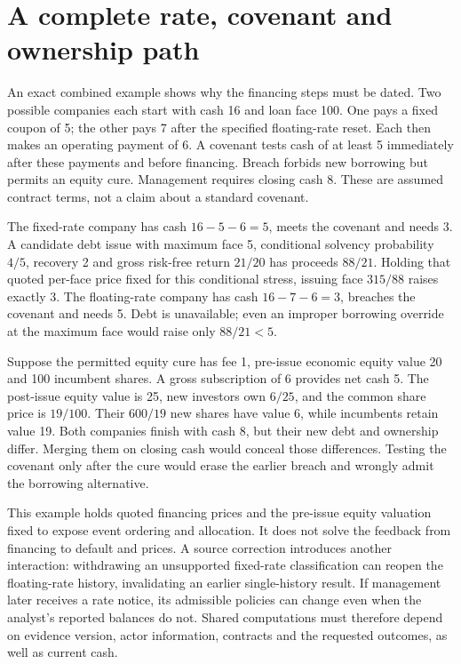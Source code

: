 


\section{A complete rate, covenant and ownership path}
An exact combined example shows why the financing steps must be dated. Two
possible companies each start with cash 16 and loan face 100. One pays a
fixed coupon of 5; the other pays 7 after the specified floating-rate reset.
Each then makes an operating payment of 6. A covenant tests cash of at least
5 immediately after these payments and before financing. Breach forbids new
borrowing but permits an equity cure. Management requires closing cash 8.
These are assumed contract terms, not a claim about a standard covenant.

The fixed-rate company has cash $16-5-6=5$, meets the covenant and needs 3.
A candidate debt issue with maximum face 5, conditional solvency probability
$4/5$, recovery 2 and gross risk-free return $21/20$ has proceeds $88/21$.
Holding that quoted per-face price fixed for this conditional stress, issuing
face $315/88$ raises exactly 3. The floating-rate company has cash
$16-7-6=3$, breaches the covenant and needs 5. Debt is unavailable; even an
improper borrowing override at the maximum face would raise only $88/21<5$.

Suppose the permitted equity cure has fee 1, pre-issue economic equity value
20 and 100 incumbent shares. A gross subscription of 6 provides net cash 5.
The post-issue equity value is 25, new investors own $6/25$, and the common
share price is $19/100$. Their $600/19$ new shares have value 6, while
incumbents retain value 19. Both companies finish with cash 8, but their new
debt and ownership differ. Merging them on closing cash would conceal those
differences. Testing the covenant only after the cure would erase the earlier
breach and wrongly admit the borrowing alternative.

This example holds quoted financing prices and the pre-issue equity valuation
fixed to expose event ordering and allocation. It does not solve the feedback
from financing to default and prices. A source correction introduces another
interaction: withdrawing an unsupported fixed-rate classification can reopen
the floating-rate history, invalidating an earlier single-history result.
If management later receives a rate notice, its admissible policies can change
even when the analyst's reported balances do not. Shared computations must
therefore depend on evidence version, actor information, contracts and the
requested outcomes, as well as current cash.


